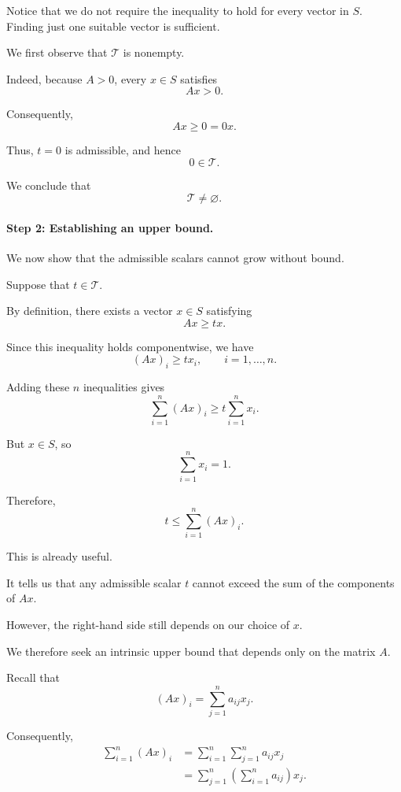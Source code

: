 \documentclass[11pt,a4paper]{article}
\theoremstyle{definition}
\theoremstyle{remark}
\begin{document}
Notice that we do not require the inequality
to hold for every vector in $S$.
Finding just one suitable vector is sufficient.

We first observe that $\mathcal{T}$
is nonempty.

Indeed, because $A>0$, every $x\in S$
satisfies
\[
Ax>0.
\]

Consequently,
\[
Ax\geq0=0x.
\]

Thus, $t=0$ is admissible, and hence
\[
0\in\mathcal{T}.
\]

We conclude that
\[
\boxed{\mathcal{T}\neq\varnothing.}
\]


\paragraph{Step 2: Establishing an upper bound.}

We now show that the admissible scalars
cannot grow without bound.

Suppose that $t\in\mathcal{T}$.

By definition, there exists a vector
$x\in S$ satisfying
\begin{equation}
Ax\geq tx.
\end{equation}

Since this inequality holds componentwise,
we have
\[
(Ax)_i\geq tx_i,
\qquad i=1,\ldots,n.
\]

Adding these $n$ inequalities gives
\[
\sum_{i=1}^{n}(Ax)_i
\geq
t\sum_{i=1}^{n}x_i.
\]

But $x\in S$, so
\[
\sum_{i=1}^{n}x_i=1.
\]

Therefore,
\begin{equation}
t\leq\sum_{i=1}^{n}(Ax)_i.
\label{eq:perron_t_first_bound}
\end{equation}

This is already useful.

It tells us that any admissible scalar
$t$ cannot exceed the sum of the
components of $Ax$.

However, the right-hand side still
depends on our choice of $x$.

We therefore seek an intrinsic upper bound
that depends only on the matrix $A$.

Recall that
\[
(Ax)_i
=
\sum_{j=1}^{n}a_{ij}x_j.
\]

Consequently,
\[
\begin{aligned}
\sum_{i=1}^{n}(Ax)_i
&=
\sum_{i=1}^{n}
\sum_{j=1}^{n}a_{ij}x_j\\
&=
\sum_{j=1}^{n}
\left(
\sum_{i=1}^{n}a_{ij}
\right)x_j.
\end{aligned}
\]
\end{document}
